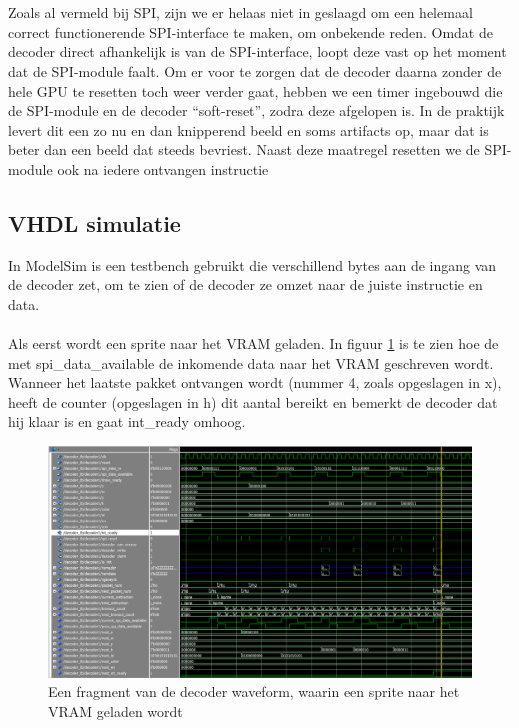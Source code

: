 \documentclass{scrartcl} %
\begin{document}
\\
\\
Zoals al vermeld bij SPI, zijn we er helaas niet in geslaagd om een helemaal correct functionerende SPI-interface te maken, om onbekende reden. Omdat de decoder direct afhankelijk is van de SPI-interface, loopt deze vast op het moment dat de SPI-module faalt. Om er voor te zorgen dat de decoder daarna zonder de hele GPU te resetten toch weer verder gaat, hebben we een timer ingebouwd die de SPI-module en de decoder ``soft-reset'', zodra deze afgelopen is. In de praktijk levert dit een zo nu en dan knipperend beeld en soms artifacts op, maar dat is beter dan een beeld dat steeds bevriest. Naast deze maatregel resetten we de SPI-module ook na iedere ontvangen instructie

\subsection{VHDL simulatie}
In ModelSim is een testbench gebruikt die verschillend bytes aan de ingang van de decoder zet, om te zien of de decoder ze omzet naar de juiste instructie en data.
\\\\
Als eerst wordt een sprite naar het VRAM geladen. In figuur \ref{fig:decoder-modelsim-lsprite} is te zien hoe de met spi\_data\_available de inkomende data naar het VRAM geschreven wordt. Wanneer het laatste pakket ontvangen wordt (nummer 4, zoals opgeslagen in x), heeft de counter (opgeslagen in h) dit aantal bereikt en bemerkt de decoder dat hij klaar is en gaat int\_ready omhoog.

\begin{figure}[H]
	\centering
	\includegraphics[width=\textwidth]{resource/decoder-modelsim-lsprite.png}
	\caption{Een fragment van de decoder waveform, waarin een sprite naar het VRAM geladen wordt}
	\label{fig:decoder-modelsim-lsprite}
\end{figure}
\end{document}
